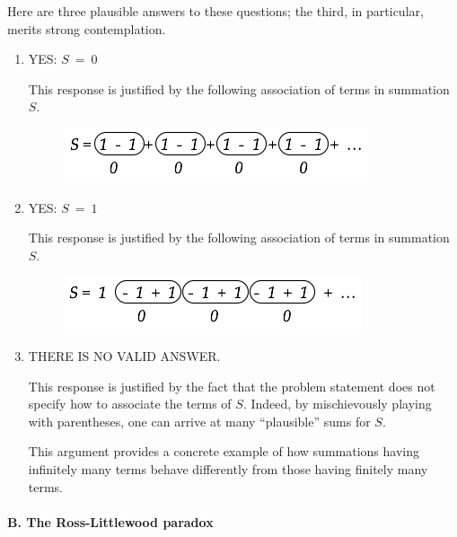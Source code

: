 \noindent
Here are three plausible answers to these questions; the third, in particular, merits strong contemplation.
\begin{enumerate}
\item
YES: $S \ = \ 0$

\smallskip

This response is justified by the following association of terms in summation $S$.
\begin{figure}[h]
\begin{center}
        \includegraphics[scale=0.45]{FiguresArithmetic/InfiniteParadox1}
\end{center}
\end{figure}

\item
YES: $S \ = \ 1$

\smallskip

This response is justified by the following association of terms in summation $S$.
\begin{figure}[h]
\begin{center}
        \includegraphics[scale=0.45]{FiguresArithmetic/InfiniteParadox2}
\end{center}
\end{figure}

\item
THERE IS NO VALID ANSWER.

\smallskip

This response is justified by the fact that the problem statement does not specify how to associate the terms of $S$.  Indeed, by mischievously playing with parentheses, one can arrive at many ``plausible'' sums for $S$.

\smallskip

This argument provides a concrete example of how summations having infinitely many terms behave differently from those having finitely many terms.
\end{enumerate}


\paragraph{B. The Ross-Littlewood paradox}


